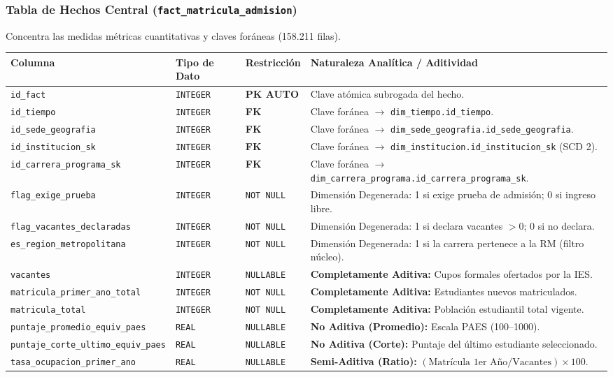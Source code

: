 \documentclass[11pt,a4paper]{article}
\begin{document}
\subsubsection{Tabla de Hechos Central (\texttt{fact\_matricula\_admision})}
Concentra las medidas métricas cuantitativas y claves foráneas (158.211 filas).
\begin{table}[h!]
\centering
\small
\begin{tabularx}{\textwidth}{lXlX}
\toprule
\textbf{Columna} & \textbf{Tipo de Dato} & \textbf{Restricción} & \textbf{Naturaleza Analítica / Aditividad} \\
\midrule
\texttt{id\_fact} & \texttt{INTEGER} & \textbf{PK AUTO} & Clave atómica subrogada del hecho. \\
\texttt{id\_tiempo} & \texttt{INTEGER} & \textbf{FK} & Clave foránea $\rightarrow$ \texttt{dim\_tiempo.id\_tiempo}. \\
\texttt{id\_sede\_geografia} & \texttt{INTEGER} & \textbf{FK} & Clave foránea $\rightarrow$ \texttt{dim\_sede\_geografia.id\_sede\_geografia}. \\
\texttt{id\_institucion\_sk} & \texttt{INTEGER} & \textbf{FK} & Clave foránea $\rightarrow$ \texttt{dim\_institucion.id\_institucion\_sk} (SCD 2). \\
\texttt{id\_carrera\_programa\_sk} & \texttt{INTEGER} & \textbf{FK} & Clave foránea $\rightarrow$ \texttt{dim\_carrera\_programa.id\_carrera\_programa\_sk}. \\
\texttt{flag\_exige\_prueba} & \texttt{INTEGER} & \texttt{NOT NULL} & Dimensión Degenerada: 1 si exige prueba de admisión; 0 si ingreso libre. \\
\texttt{flag\_vacantes\_declaradas} & \texttt{INTEGER} & \texttt{NOT NULL} & Dimensión Degenerada: 1 si declara vacantes $>0$; 0 si no declara. \\
\texttt{es\_region\_metropolitana} & \texttt{INTEGER} & \texttt{NOT NULL} & Dimensión Degenerada: 1 si la carrera pertenece a la RM (filtro núcleo). \\
\texttt{vacantes} & \texttt{INTEGER} & \texttt{NULLABLE} & \textbf{Completamente Aditiva:} Cupos formales ofertados por la IES. \\
\texttt{matricula\_primer\_ano\_total} & \texttt{INTEGER} & \texttt{NOT NULL} & \textbf{Completamente Aditiva:} Estudiantes nuevos matriculados. \\
\texttt{matricula\_total} & \texttt{INTEGER} & \texttt{NOT NULL} & \textbf{Completamente Aditiva:} Población estudiantil total vigente. \\
\texttt{puntaje\_promedio\_equiv\_paes} & \texttt{REAL} & \texttt{NULLABLE} & \textbf{No Aditiva (Promedio):} Escala PAES (100--1000). \\
\texttt{puntaje\_corte\_ultimo\_equiv\_paes} & \texttt{REAL} & \texttt{NULLABLE} & \textbf{No Aditiva (Corte):} Puntaje del último estudiante seleccionado. \\
\texttt{tasa\_ocupacion\_primer\_ano} & \texttt{REAL} & \texttt{NULLABLE} & \textbf{Semi-Aditiva (Ratio):} $(\text{Matrícula 1er Año} / \text{Vacantes}) \times 100$. \\
\bottomrule
\end{tabularx}
\end{table}
\end{document}
